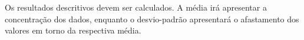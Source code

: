 \documentclass[
]{book}
\newenvironment{Shaded}{\begin{snugshade}}{\end{snugshade}}
\newcommand{\DataTypeTok}[1]{\textcolor[rgb]{0.13,0.29,0.53}{#1}}
\newcommand{\KeywordTok}[1]{\textcolor[rgb]{0.13,0.29,0.53}{\textbf{#1}}}
\newcommand{\NormalTok}[1]{#1}
\newcommand{\OperatorTok}[1]{\textcolor[rgb]{0.81,0.36,0.00}{\textbf{#1}}}
\newcommand{\StringTok}[1]{\textcolor[rgb]{0.31,0.60,0.02}{#1}}
\begin{document}
Os resultados descritivos devem ser calculados. A média irá apresentar a concentração dos dados, enquanto o desvio-padrão apresentará o afastamento dos valores em torno da respectiva média.

\begin{Shaded}
\end{Shaded}
\end{document}
